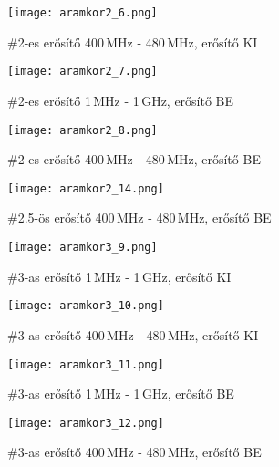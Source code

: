 \begin{figure}[!ht]
	\centering
	\texttt{[image: aramkor2\_6.png]}
	\caption{\#2-es erősítő 400\,MHz - 480\,MHz, erősítő KI}
	\label{fig:meres6}
\end{figure}

\begin{figure}[!ht]
	\centering
	\texttt{[image: aramkor2\_7.png]}
	\caption{\#2-es erősítő 1\,MHz - 1\,GHz, erősítő BE}
	\label{fig:meres7}
\end{figure}

\begin{figure}[!ht]
	\centering
	\texttt{[image: aramkor2\_8.png]}
	\caption{\#2-es erősítő 400\,MHz - 480\,MHz, erősítő BE}
	\label{fig:meres8}
\end{figure}

\begin{figure}[!ht]
	\centering
	\texttt{[image: aramkor2\_14.png]}
	\caption{\#2.5-ös erősítő 400\,MHz - 480\,MHz, erősítő BE}
	\label{fig:meres14}
\end{figure}



\begin{figure}[!ht]
	\centering
	\texttt{[image: aramkor3\_9.png]}
	\caption{\#3-as erősítő 1\,MHz - 1\,GHz, erősítő KI}
	\label{fig:meres9}
\end{figure}

\begin{figure}[!ht]
	\centering
	\texttt{[image: aramkor3\_10.png]}
	\caption{\#3-as erősítő 400\,MHz - 480\,MHz, erősítő KI}
	\label{fig:meres10}
\end{figure}

\begin{figure}[!ht]
	\centering
	\texttt{[image: aramkor3\_11.png]}
	\caption{\#3-as erősítő 1\,MHz - 1\,GHz, erősítő BE}
	\label{fig:meres11}
\end{figure}

\begin{figure}[!ht]
	\centering
	\texttt{[image: aramkor3\_12.png]}
	\caption{\#3-as erősítő 400\,MHz - 480\,MHz, erősítő BE}
	\label{fig:meres12}
\end{figure}

\newpage

